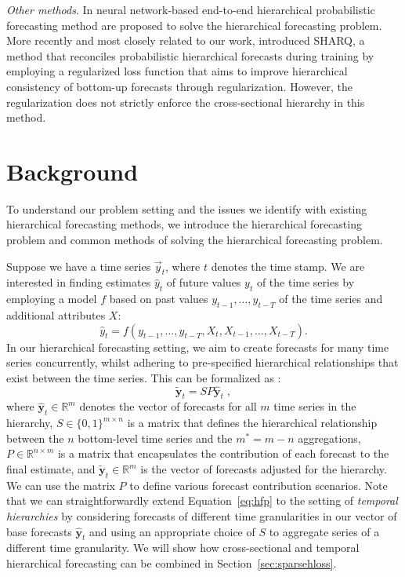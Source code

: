 \documentclass[preprint, 3p, times, twocolumn]{elsarticle}
\begin{document}
\textit{Other methods}. In \cite{rangapuram_endtoend_2021,rangapuram_coherent_2023} neural network-based end-to-end hierarchical probabilistic forecasting method are proposed to solve the hierarchical forecasting problem. More recently and most closely related to our work, \citet{han_simultaneously_2021} introduced SHARQ, a method that reconciles probabilistic hierarchical forecasts during training by employing a regularized loss function that aims to improve hierarchical consistency of bottom-up forecasts through regularization. However, the regularization does not strictly enforce the cross-sectional hierarchy in this method.

\section{Background} \label{sec:background}
To understand our problem setting and the issues we identify with existing hierarchical forecasting methods, we introduce the hierarchical forecasting problem and common methods of solving the hierarchical forecasting problem.

Suppose we have a time series \(\vec{y}_t\), where \(t\) denotes the time stamp. We are interested in finding estimates \(\hat{y}_{t}\) of future values \({y}_{t}\) of the time series by employing a model \(f\) based on past values \(y_{t-1}, \dots, y_{t-T}\) of the time series and additional attributes \(X\):
\begin{equation}
  \hat{y}_{t} = f(y_{t-1}, \dots, y_{t-T}, X_{t}, X_{t-1}, \dots, X_{t-T}).
\end{equation}
In our hierarchical forecasting setting, we aim to create forecasts for many time series concurrently, whilst adhering to pre-specified hierarchical relationships that exist between the time series. This can be formalized as \cite{hyndman_forecasting_2021}:
\begin{equation} \label{eq:hfp}
  \tilde{\textbf{y}}_{t} = SP\hat{\textbf{y}}_{t} \;,
\end{equation}
where \(\hat{\textbf{y}}_{t} \in \mathbb{R}^{m} \) denotes the vector of forecasts for all \(m\) time series in the hierarchy, \(S \in \{0, 1\}^{m \times n}\) is a matrix that defines the hierarchical relationship between the \(n\) bottom-level time series and the \(m^* = m - n\) aggregations, \(P \in \mathbb{R}^{n \times m}\) is a matrix that encapsulates the contribution of each forecast to the final estimate, and \(\tilde{\textbf{y}}_{t} \in \mathbb{R}^{m} \) is the vector of forecasts adjusted for the hierarchy. We can use the matrix \(P\) to define various forecast contribution scenarios. Note that we can straightforwardly extend Equation~\eqref{eq:hfp} to the setting of \textit{temporal hierarchies} \cite{athanasopoulos_forecasting_2017,rangapuram_coherent_2023} by considering forecasts of different time granularities in our vector of base forecasts \(\hat{\textbf{y}}_{t}\) and using an appropriate choice of \(S\) to aggregate series of a different time granularity. We will show how cross-sectional and temporal hierarchical forecasting can be combined in Section~\ref{sec:sparsehloss}.
\end{document}
